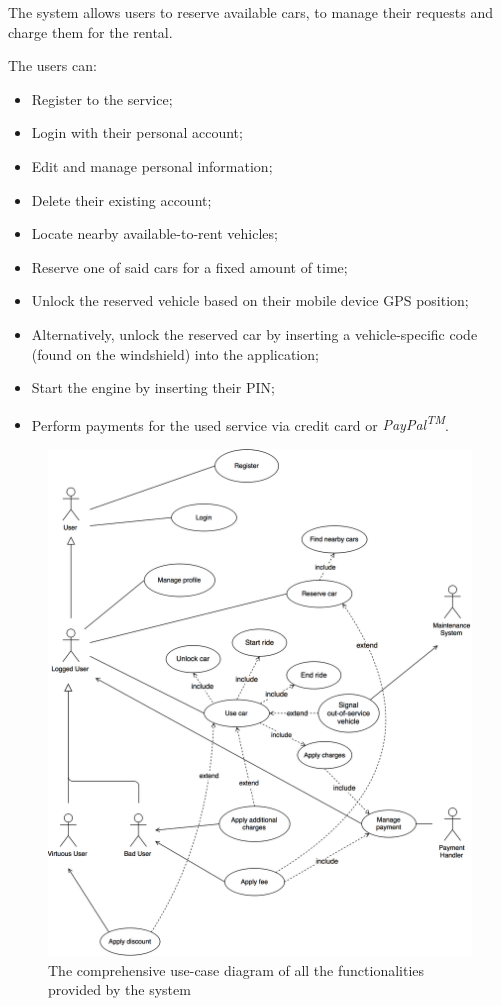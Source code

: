 The system allows users to reserve available cars, to manage their requests and charge them for the rental.

The users can:
\begin{itemize}
\item Register to the service;
\item Login with their personal account;
\item Edit and manage personal information;
\item Delete their existing account;
\item Locate nearby available-to-rent vehicles;
\item Reserve one of said cars for a fixed amount of time;
\item Unlock the reserved vehicle based on their mobile device GPS position;
\item Alternatively, unlock the reserved car by inserting a vehicle-specific code (found on the windshield) into the application;
\item Start the engine by inserting their PIN;
\item Perform payments for the used service via credit card or \emph{PayPal\textsuperscript{TM}}.
\end{itemize}
\begin{figure}[!h]
	\centering
		\includegraphics[width=\textwidth]{./pictures/use_case.png}
		\caption{The comprehensive use-case diagram of all the functionalities provided by the 						system}
	\label{global_uc}
\end{figure}